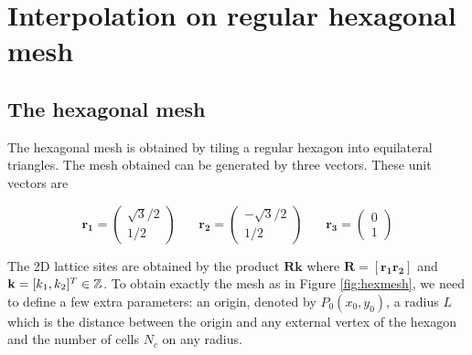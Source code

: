 \documentclass[proc]{edpsmath}
\begin{document}
\section{Interpolation on regular hexagonal mesh}
\label{sec:interpolation}
\subsection{The hexagonal mesh}

The hexagonal mesh is obtained by tiling a regular hexagon into equilateral triangles. The mesh obtained can be generated by three vectors. These unit vectors are

\begin{equation}\label{eq:unit_vect}
	\mathbf{r_1} = \begin{pmatrix}\sqrt{3}/2 \\  1/2
		\end{pmatrix} ~~~~~~~~
	\mathbf{r_2} = \begin{pmatrix}-\sqrt{3}/2 \\ 1/2
		\end{pmatrix} ~~~~~~~~
	\mathbf{r_3} = \begin{pmatrix} 0 \\ 1
		\end{pmatrix}
\end{equation}

The 2D lattice sites are obtained by the product $\mathbf{Rk}$ where $\mathbf{R} = [\mathbf{r_1 r_2}]$ and $\mathbf{k} = [k_1, k_2]^T \in \mathbb{Z}$.  To obtain exactly the mesh as in Figure \ref{fig:hexmesh}, we need to define a few extra parameters: an origin, denoted by $P_0(x_0, y_0)$, a radius $L$ which is the distance between the origin and any external vertex of the hexagon and the number of cells $N_c$ on any radius.
\end{document}
